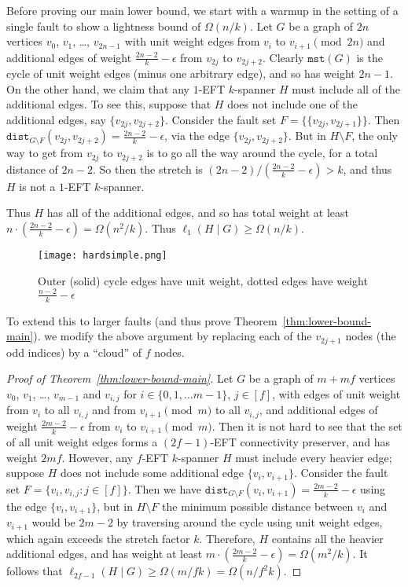 \documentclass{article}
\theoremstyle{plain}
\theoremstyle{definition}
\newcommand{\dist}{\texttt{dist}}
\newcommand{\mst}{\texttt{mst}}
\begin{document}
Before proving our main lower bound, we start with a warmup in the setting of a single fault to show a lightness bound of $\Omega(n/k)$. Let $G$ be a graph of $2n$ vertices $v_0$, $v_1$, \ldots, $v_{2n-1}$ with unit weight edges from $v_i$ to $v_{i+1} \pmod{2n}$  and additional edges of weight $\frac{2n-2}{k} - \epsilon$ from $v_{2j}$ to $v_{2j+2}$. Clearly $\mst(G)$ is the cycle of unit weight edges (minus one arbitrary edge), and so has weight $2n-1$.  On the other hand, we claim that any $1$-EFT $k$-spanner $H$ must include all of the additional edges.  To see this, suppose that $H$ does not include one of the additional edges, say $\{v_{2j}, v_{2j+2}\}$.  Consider the fault set $F = \{\{v_{2j}, v_{2j+1}\}\}$.  Then $\dist_{G \setminus F}(v_{2j}, v_{2j+2}) = \frac{2n-2}{k} - \epsilon$, via the edge $\{v_{2j}, v_{2j+2}\}$.  But in $H \setminus F$, the only way to get from $v_{2j}$ to $v_{2j+2}$ is to go all the way around the cycle, for a total distance of $2n-2$.  So then the stretch is $(2n-2) / \left(\frac{2n-2}{k} - \epsilon\right) > k$, and thus $H$ is not a $1$-EFT $k$-spanner.  

Thus $H$ has all of the additional edges, and so has total weight at least $n \cdot \left(\frac{2n-2}{k} - \epsilon\right) = \Omega(n^2 / k)$.  Thus $\ell_1(H \mid G) \geq \Omega(n/k)$.

\begin{figure}[h]
    \centering
    \texttt{[image: hardsimple.png]}
    \caption{Outer (solid) cycle edges have unit weight, dotted edges have weight $\frac{n-2}{k} - \epsilon$}
    \label{fig:enter-label}
\end{figure}

To extend this to larger faults (and thus prove Theorem~\ref{thm:lower-bound-main}). we modify the above argument by replacing each of the $v_{2j+1}$ nodes (the odd indices) by a ``cloud'' of $f$ nodes.

\begin{proof}[Proof of Theorem~\ref{thm:lower-bound-main}]
    Let $G$ be a graph of $m+mf$ vertices $v_0$, $v_1$, \ldots, $v_{m-1}$ and $v_{i,j}$ for $i \in \{0, 1, \ldots m-1\}$, $j \in [f]$, with edges of unit weight from $v_i$ to all $v_{i,j}$ and from $v_{i+1} \pmod{m}$ to all $v_{i,j}$, and additional edges of weight $\frac{2m-2}{k} - \epsilon$ from $v_i$ to $v_{i+1} \pmod{m}$. Then it is not hard to see that the set of all unit weight edges forms a $(2f-1)$-EFT connectivity preserver, and has weight $2mf$. However, any $f$-EFT $k$-spanner $H$ must include every heavier edge; suppose $H$ does not include some additional edge $\{v_i, v_{i+1}\}$. Consider the fault set $F = \{{v_i, v_{i,j}}: j \in [f]\}$. Then we have $\dist_{G\setminus F} (v_i, v_{i+1}) = \frac{2m-2}{k} - \epsilon$ using the edge $\{v_i, v_{i+1}\}$, but in $H \setminus F$ the minimum possible distance between $v_i$ and $v_{i+1}$ would be $2m-2$ by traversing around the cycle using unit weight edges, which again exceeds the stretch factor $k$. Therefore, $H$ contains all the heavier additional edges, and has weight at least $m\cdot (\frac{2m-2}{k} - \epsilon) = \Omega(m^2/k)$. It follows that $\ell_{2f-1}(H \mid G) \geq \Omega(m/fk) = \Omega(n/f^2k)$. 
\end{proof}
\end{document}
